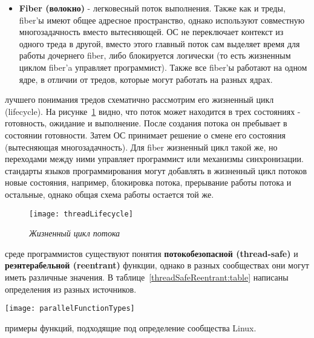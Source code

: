{\begin{itemize}
			\item\textbf{Fiber (волокно)} - легковесный поток выполнения. Также как и треды, fiber'ы имеют общее адресное пространство, однако используют совместную многозадачность вместо вытесняющей. ОС не переключает контекст из одного треда в другой, вместо этого главный поток сам выделяет время для работы дочернего fiber, либо блокируется логически (то есть жизненным циклом fiber'a управляет программист). Также все fiber'ы работают на одном ядре, в отличии от тредов, которые могут работать на разных ядрах.
		\end{itemize}
	 лучшего понимания тредов схематично рассмотрим его жизненный цикл (lifecycle). На рисунке~\ref{threadLifecycle:image} видно, что поток может находится в трех состояниях - готовность, ожидание и выполнение. После создания потока он пребывает в состоянии готовности. Затем ОС принимает решение о смене его состояния (вытесняющая многозадачность). Для fiber жизненный цикл такой же, но переходами между ними управляет программист или механизмы синхронизации.
	 стандарты языков программирования могут добавлять в жизненный цикл потоков новые состояния, например, блокировка потока, прерывание работы потока и остальные, однако общая схема работы остается той же.
		\begin{figure}[H]
			\texttt{[image: threadLifecycle]}
			\caption{\textit{Жизненный цикл потока}}
			\label{threadLifecycle:image}
		\end{figure}
	 среде программистов существуют понятия \textbf{потокобезопасной (thread-safe)} и \textbf{реэнтерабельной (reentrant)} функции, однако в разных сообществах они могут иметь различные значения. В таблице~\ref{threadSafeReentrant:table} написаны определения из разных источников.
	\begin{table}[H]
		\caption{Определения thread-safe и reentrant функций}
		\label{threadSafeReentrant:table}
		\begin{center}
					\texttt{[image: parallelFunctionTypes]}
		\end{center}
	\end{table}
	 примеры функций, подходящие под определение сообщества Linux.
	\begin{figure}[H]
		

\end{figure}}
